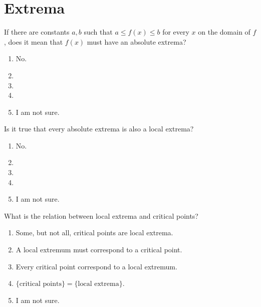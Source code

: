 \documentclass[14pt]{beamer}
\begin{document}
\section{Extrema}

\begin{frame}[t]
  If there are constants \(a,b\) such that \(a \le f(x) \le b\) for every \(x\) on the domain of \(f\), does it mean that \(f(x)\) must have an absolute extrema?

  \medskip
  \begin{enumerate} 
    \item No.
    \item {} 
    \item 
    \item 
    \item I am not sure.
  \end{enumerate} 
\end{frame}


\begin{frame}[t]
  Is it true that every absolute extrema is also a local extrema?

  \medskip
  \begin{enumerate} 
    \item No.
    \item {} 
    \item 
    \item 
    \item I am not sure.
  \end{enumerate} 
\end{frame}

\begin{frame}[t]
  What is the relation between local extrema and critical points?

  \medskip
  \begin{enumerate} \setlength\itemsep{1ex}
    \item Some, but not all, critical points are local extrema.
    \item A local extremum must correspond to a critical point.
    \item Every critical point correspond to a local extremum.
    \item \(\{ \text{critical points} \} = \{ \text{local extrema} \}\).
    \item I am not sure.
  \end{enumerate} 
\end{frame}
\end{document}
